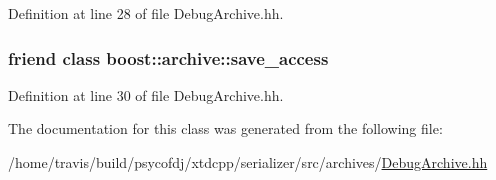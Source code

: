 Definition at line 28 of file Debug\-Archive.\-hh.

\hypertarget{classxtd_1_1serializer_1_1DebugXmlOArchive_aaca003bb8a4fc59424e4025130da4edd}{
\subsubsection[{boost\-::archive\-::save\-\_\-access}]{\setlength{\rightskip}{0pt plus 5cm}friend class boost\-::archive\-::save\-\_\-access\hspace{0.3cm}{\ttfamily [friend]}}}\label{classxtd_1_1serializer_1_1DebugXmlOArchive_aaca003bb8a4fc59424e4025130da4edd}


Definition at line 30 of file Debug\-Archive.\-hh.



The documentation for this class was generated from the following file\-:\begin{DoxyCompactItemize}
\item 
/home/travis/build/psycofdj/xtdcpp/serializer/src/archives/\hyperlink{DebugArchive_8hh}{Debug\-Archive.\-hh}\end{DoxyCompactItemize}
